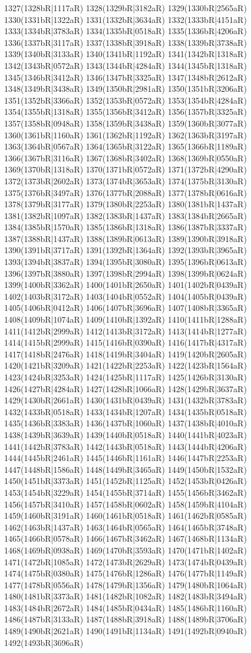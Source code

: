 1327(1328bR|1117aR) 1328(1329bR|3182aR) 1329(1330bR|2565aR) 1330(1331bR|1322aR) 1331(1332bR|3634aR) 1332(1333bR|4151aR) 1333(1334bR|3783aR) 1334(1335bR|0518aR) 1335(1336bR|4206aR) 1336(1337bR|3117aR) 1337(1338bR|3918aR) 1338(1339bR|3738aR) 1339(1340bR|3133aR) 1340(1341bR|1192aR) 1341(1342bR|1318aR) 1342(1343bR|0572aR) 1343(1344bR|4284aR) 1344(1345bR|1318aR) 1345(1346bR|3412aR) 1346(1347bR|3325aR) 1347(1348bR|2612aR) 1348(1349bR|3438aR) 1349(1350bR|2981aR) 1350(1351bR|3206aR) 1351(1352bR|3366aR) 1352(1353bR|0572aR) 1353(1354bR|4284aR) 1354(1355bR|1318aR) 1355(1356bR|3412aR) 1356(1357bR|3325aR) 1357(1358bR|0948aR) 1358(1359bR|3438aR) 1359(1360bR|3077aR) 1360(1361bR|1160aR) 1361(1362bR|1192aR) 1362(1363bR|3197aR) 1363(1364bR|0567aR) 1364(1365bR|3122aR) 1365(1366bR|1189aR) 1366(1367bR|3116aR) 1367(1368bR|3402aR) 1368(1369bR|0550aR) 1369(1370bR|1318aR) 1370(1371bR|0572aR) 1371(1372bR|4290aR) 1372(1373bR|2602aR) 1373(1374bR|3653aR) 1374(1375bR|3130aR) 1375(1376bR|3497aR) 1376(1377bR|2088aR) 1377(1378bR|0616aR) 1378(1379bR|3177aR) 1379(1380bR|2253aR) 1380(1381bR|1437aR) 1381(1382bR|1097aR) 1382(1383bR|1437aR) 1383(1384bR|2665aR) 1384(1385bR|1570aR) 1385(1386bR|1318aR) 1386(1387bR|3337aR) 1387(1388bR|1437aR) 1388(1389bR|0613aR) 1389(1390bR|3918aR) 1390(1391bR|3717aR) 1391(1392bR|1364aR) 1392(1393bR|3965aR) 1393(1394bR|3837aR) 1394(1395bR|3080aR) 1395(1396bR|0613aR) 1396(1397bR|3880aR) 1397(1398bR|2994aR) 1398(1399bR|0624aR) 1399(1400bR|3362aR) 1400(1401bR|2650aR) 1401(1402bR|0439aR) 1402(1403bR|3172aR) 1403(1404bR|0552aR) 1404(1405bR|0439aR) 1405(1406bR|0412aR) 1406(1407bR|3696aR) 1407(1408bR|3365aR) 1408(1409bR|1074aR) 1409(1410bR|1392aR) 1410(1411bR|1288aR) 1411(1412bR|2999aR) 1412(1413bR|3172aR) 1413(1414bR|1277aR) 1414(1415bR|2999aR) 1415(1416bR|0390aR) 1416(1417bR|4317aR) 1417(1418bR|2476aR) 1418(1419bR|3404aR) 1419(1420bR|2605aR) 1420(1421bR|3209aR) 1421(1422bR|2253aR) 1422(1423bR|1564aR) 1423(1424bR|3253aR) 1424(1425bR|1117aR) 1425(1426bR|3130aR) 1426(1427bR|4284aR) 1427(1428bR|1066aR) 1428(1429bR|3637aR) 1429(1430bR|2661aR) 1430(1431bR|0439aR) 1431(1432bR|3783aR) 1432(1433bR|0518aR) 1433(1434bR|1207aR) 1434(1435bR|0518aR) 1435(1436bR|3383aR) 1436(1437bR|1060aR) 1437(1438bR|4010aR) 1438(1439bR|3639aR) 1439(1440bR|0518aR) 1440(1441bR|4023aR) 1441(1442bR|3783aR) 1442(1443bR|0518aR) 1443(1444bR|4206aR) 1444(1445bR|2461aR) 1445(1446bR|1161aR) 1446(1447bR|2253aR) 1447(1448bR|1586aR) 1448(1449bR|3465aR) 1449(1450bR|1532aR) 1450(1451bR|3373aR) 1451(1452bR|1125aR) 1452(1453bR|0426aR) 1453(1454bR|3229aR) 1454(1455bR|3714aR) 1455(1456bR|3462aR) 1456(1457bR|3410aR) 1457(1458bR|0602aR) 1458(1459bR|4104aR) 1459(1460bR|3191aR) 1460(1461bR|0518aR) 1461(1462bR|0585aR) 1462(1463bR|1437aR) 1463(1464bR|0565aR) 1464(1465bR|3748aR) 1465(1466bR|0578aR) 1466(1467bR|3462aR) 1467(1468bR|1134aR) 1468(1469bR|0938aR) 1469(1470bR|3593aR) 1470(1471bR|1402aR) 1471(1472bR|1085aR) 1472(1473bR|2629aR) 1473(1474bR|0439aR) 1474(1475bR|0380aR) 1475(1476bR|1286aR) 1476(1477bR|1149aR) 1477(1478bR|0556aR) 1478(1479bR|1356aR) 1479(1480bR|1064aR) 1480(1481bR|3373aR) 1481(1482bR|1082aR) 1482(1483bR|3494aR) 1483(1484bR|2672aR) 1484(1485bR|0434aR) 1485(1486bR|1160aR) 1486(1487bR|3133aR) 1487(1488bR|3918aR) 1488(1489bR|3706aR) 1489(1490bR|2621aR) 1490(1491bR|1134aR) 1491(1492bR|0940aR) 1492(1493bR|3696aR) 